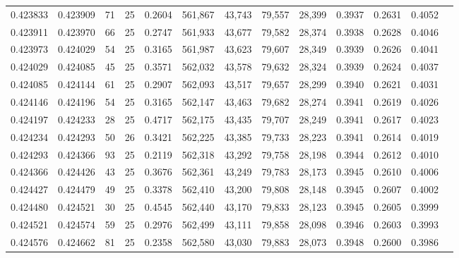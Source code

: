 \begin{tabular}{rrrrrrrrrrrrr}
0.423833 & 0.423909 &    71 &  25 &                                     0.2604 & 561,867 &  43,743 &  79,557 &  28,399 & 0.3937 & 0.2631 & 0.4052 \\
0.423911 & 0.423970 &    66 &  25 &                                     0.2747 & 561,933 &  43,677 &  79,582 &  28,374 & 0.3938 & 0.2628 & 0.4046 \\
0.423973 & 0.424029 &    54 &  25 &                                     0.3165 & 561,987 &  43,623 &  79,607 &  28,349 & 0.3939 & 0.2626 & 0.4041 \\
0.424029 & 0.424085 &    45 &  25 &                                     0.3571 & 562,032 &  43,578 &  79,632 &  28,324 & 0.3939 & 0.2624 & 0.4037 \\
0.424085 & 0.424144 &    61 &  25 &                                     0.2907 & 562,093 &  43,517 &  79,657 &  28,299 & 0.3940 & 0.2621 & 0.4031 \\
0.424146 & 0.424196 &    54 &  25 &                                     0.3165 & 562,147 &  43,463 &  79,682 &  28,274 & 0.3941 & 0.2619 & 0.4026 \\
0.424197 & 0.424233 &    28 &  25 &                                     0.4717 & 562,175 &  43,435 &  79,707 &  28,249 & 0.3941 & 0.2617 & 0.4023 \\
0.424234 & 0.424293 &    50 &  26 &                                     0.3421 & 562,225 &  43,385 &  79,733 &  28,223 & 0.3941 & 0.2614 & 0.4019 \\
0.424293 & 0.424366 &    93 &  25 &                                     0.2119 & 562,318 &  43,292 &  79,758 &  28,198 & 0.3944 & 0.2612 & 0.4010 \\
0.424366 & 0.424426 &    43 &  25 &                                     0.3676 & 562,361 &  43,249 &  79,783 &  28,173 & 0.3945 & 0.2610 & 0.4006 \\
0.424427 & 0.424479 &    49 &  25 &                                     0.3378 & 562,410 &  43,200 &  79,808 &  28,148 & 0.3945 & 0.2607 & 0.4002 \\
0.424480 & 0.424521 &    30 &  25 &                                     0.4545 & 562,440 &  43,170 &  79,833 &  28,123 & 0.3945 & 0.2605 & 0.3999 \\
0.424521 & 0.424574 &    59 &  25 &                                     0.2976 & 562,499 &  43,111 &  79,858 &  28,098 & 0.3946 & 0.2603 & 0.3993 \\
0.424576 & 0.424662 &    81 &  25 &                                     0.2358 & 562,580 &  43,030 &  79,883 &  28,073 & 0.3948 & 0.2600 & 0.3986 \\

\end{tabular}
